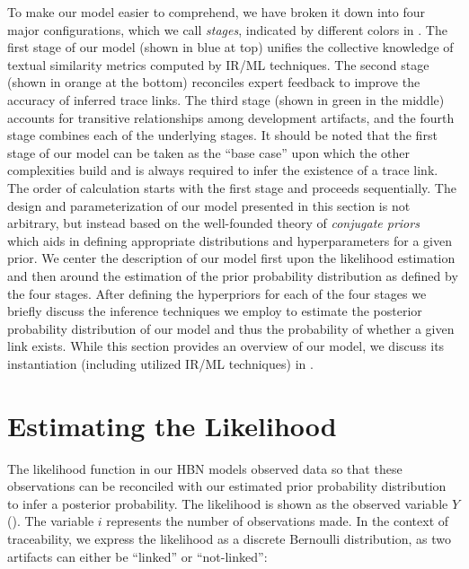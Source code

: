 To make our model easier to comprehend, we have broken it down into four major configurations, which we call \textit{stages}, indicated by different colors in . The first stage of our model (shown in blue at top) unifies the collective knowledge of textual similarity metrics computed by IR/ML techniques. The second stage (shown in orange at the bottom) reconciles expert feedback to improve the accuracy of inferred trace links. The third stage (shown in green in the middle) accounts for transitive relationships among development artifacts, and the fourth stage combines each of the underlying stages. It should be noted that the first stage of our model can be taken as the ``base case'' upon which the other complexities build and is always required to infer the existence of a trace link.  The order of calculation starts with the first stage and proceeds sequentially. The design and parameterization of our model presented in this section is not arbitrary, but instead based on the well-founded theory of \textit{conjugate priors}~\citep{Raiffa:61} which aids in defining appropriate distributions and hyperparameters for a given prior. We center the description of our model first upon the likelihood estimation and then around the estimation of the prior probability distribution as defined by the four stages. After defining the hyperpriors for each of the four stages we briefly discuss the inference techniques we employ to estimate the posterior probability distribution of our model and thus the probability of whether a given link exists. While this section provides an overview of our model, we discuss its instantiation (including utilized IR/ML techniques) in  .


\section{Estimating the Likelihood}
\label{sec:model-likelihood}

The likelihood function in our HBN models observed data so that these observations can be reconciled with our estimated prior probability distribution to infer a posterior probability.  The likelihood is shown as the observed variable $Y$ (). The variable $i$ represents the number of observations made. In the context of traceability, we express the likelihood as a discrete Bernoulli distribution, as two artifacts can either be ``linked'' or ``not-linked'':


